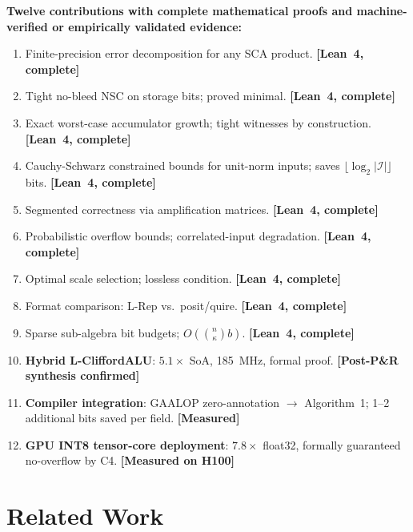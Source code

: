 \documentclass[11pt,a4paper]{article}
\theoremstyle{definition}
\theoremstyle{plain}
\theoremstyle{remark}
\begin{document}
\begin{contribution}
\textbf{Twelve contributions with complete mathematical proofs and
machine-verified or empirically validated evidence:}
\begin{enumerate}[label=C\arabic*.]
  \item Finite-precision error decomposition for any SCA product.
        \textbf{[Lean~4, complete]}
  \item Tight no-bleed NSC on storage bits; proved minimal.
        \textbf{[Lean~4, complete]}
  \item Exact worst-case accumulator growth; tight witnesses by construction.
        \textbf{[Lean~4, complete]}
  \item Cauchy-Schwarz constrained bounds for unit-norm inputs;
        saves $\lfloor\log_2|\mathcal{I}|\rfloor$ bits.
        \textbf{[Lean~4, complete]}
  \item Segmented correctness via amplification matrices.
        \textbf{[Lean~4, complete]}
  \item Probabilistic overflow bounds; correlated-input degradation.
        \textbf{[Lean~4, complete]}
  \item Optimal scale selection; lossless condition.
        \textbf{[Lean~4, complete]}
  \item Format comparison: L-Rep vs.\ posit/quire.
        \textbf{[Lean~4, complete]}
  \item Sparse sub-algebra bit budgets; $O\!\left(\binom{n}{\kappa}b\right)$.
        \textbf{[Lean~4, complete]}
  \item \textbf{Hybrid L-CliffordALU}: $5.1\times$ SoA, 185~MHz, formal proof.
        \textbf{[Post-P\&R synthesis confirmed]}
  \item \textbf{Compiler integration}: GAALOP zero-annotation $\to$
        Algorithm~1; 1--2 additional bits saved per field.
        \textbf{[Measured]}
  \item \textbf{GPU INT8 tensor-core deployment}: $7.8\times$ float32,
        formally guaranteed no-overflow by C4.
        \textbf{[Measured on H100]}
\end{enumerate}
\end{contribution}

\section{Related Work}
\label{sec:related}
\end{document}
